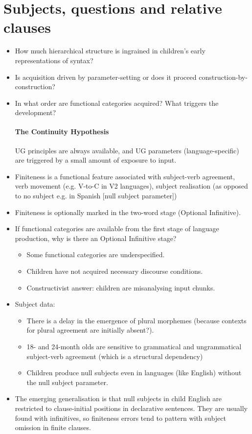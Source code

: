 \documentclass{article}
\begin{document}
\section{Subjects, questions and relative clauses}
\begin{itemize}
    \item How much hierarchical structure is ingrained in children's early representations of syntax?
    \item Is acquisition driven by parameter-setting or does it proceed construction-by-construction?
    \item In what order are functional categories acquired? What triggers the development?
    \paragraph{The Continuity Hypothesis} UG principles are always available, and UG parameters (language-specific) are triggered by a small amount of exposure to input.
    \item Finiteness is a functional feature associated with subject-verb agreement, verb movement (e.g. V-to-C in V2 languages), subject realisation (as opposed to no subject e.g. in Spanish [null subject parameter])
    \item Finiteness is optionally marked in the two-word stage (Optional Infinitive).
    \item If functional categories are available from the first stage of language production, why is there an Optional Infinitive stage?
    \begin{itemize}
        \item Some functional categories are underspecified.
        \item Children have not acquired necessary discourse conditions.
        \item Constructivist answer: children are misanalysing input chunks.
    \end{itemize}
    \item Subject data:
    \begin{itemize}
        \item There is a delay in the emergence of plural morphemes (because contexts for plural agreement are initially absent?).
        \item 18- and 24-month olds are sensitive to grammatical and ungrammatical subject-verb agreement (which is a structural dependency)
        \item Children produce null subjects even in languages (like English) without the null subject parameter.
    \end{itemize}
    \item The emerging generalisation is that null subjects in child English are restricted to clause-initial positions in declarative sentences. They are usually found with infinitives, so finiteness errors tend to pattern with subject omission in finite clauses.

\end{itemize}
\end{document}
